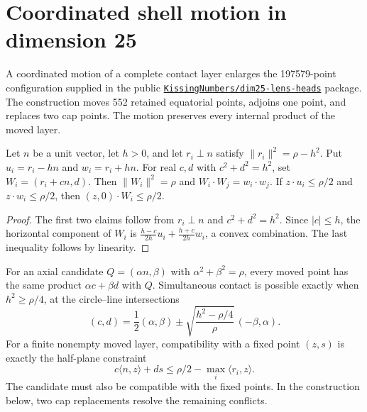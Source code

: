 \section{Coordinated shell motion in dimension 25}\label{sec:motion25}
\providecommand{\ip}[2]{\langle #1,#2\rangle}

\noindent
A coordinated motion of a complete contact layer enlarges the 197579-point
configuration supplied in the public
\href{https://github.com/alexlegeartis/KissingNumbers/tree/cf14c5ef4db6059bbf2e570e3f0ce24edfda243e/verifications/improved/dim25-lens-heads}
{\texttt{KissingNumbers/dim25-lens-heads}} package.
The construction moves 552 retained equatorial points, adjoins one point,
and replaces two cap points. The motion preserves every internal product
of the moved layer.

\begin{lemma}\label{lem:chord-motion}
Let $n$ be a unit vector, let $h>0$, and let $r_i\perp n$ satisfy
$\|r_i\|^2=\rho-h^2$. Put $u_i=r_i-hn$ and $w_i=r_i+hn$.
For real $c,d$ with $c^2+d^2=h^2$, set $W_i=(r_i+cn,d)$.
Then $\|W_i\|^2=\rho$ and $W_i\cdot W_j=w_i\cdot w_j$.
If $z\cdot u_i\le\rho/2$ and $z\cdot w_i\le\rho/2$, then
$(z,0)\cdot W_i\le\rho/2$.
\end{lemma}
\begin{proof}
The first two claims follow from $r_i\perp n$ and $c^2+d^2=h^2$.
Since $|c|\le h$, the horizontal component of $W_i$ is
$\frac{h-c}{2h}u_i+\frac{h+c}{2h}w_i$, a convex combination.
The last inequality follows by linearity.
\end{proof}

For an axial candidate $Q=(\alpha n,\beta)$ with
$\alpha^2+\beta^2=\rho$, every moved point has the same product
$\alpha c+\beta d$ with $Q$. Simultaneous contact is possible exactly
when $h^2\ge\rho/4$, at the circle--line intersections
\begin{equation}\label{eq:chord-contact}
 (c,d)=\frac12(\alpha,\beta)
       \mathbin{\pm}\sqrt{\frac{h^2-\rho/4}{\rho}}\,(-\beta,\alpha).
\end{equation}
For a finite nonempty moved layer, compatibility with a fixed point
$(z,s)$ is exactly the half-plane constraint
\begin{equation}\label{eq:chord-boundary}
 c\ip nz+ds\le\rho/2-\max_i\ip{r_i}z.
\end{equation}
The candidate must also be compatible with the fixed points. In the
construction below, two cap replacements resolve the remaining conflicts.

